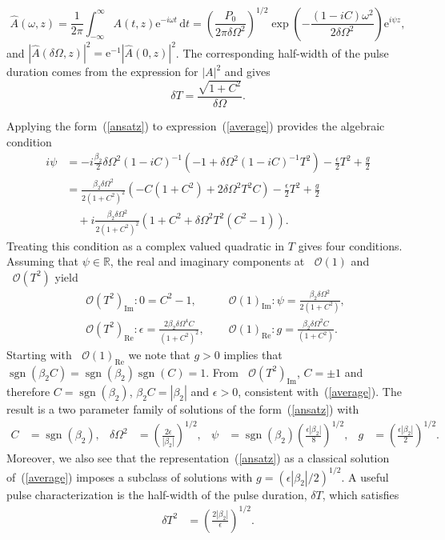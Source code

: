\documentclass[12pt]{article}
\providecommand{\df}{\textrm{d}}
\providecommand{\bigO}[1]{\ensuremath{\mathop{}\mathopen{}\mathcal{O}\mathopen{}\left(#1\right)}}
\DeclareMathOperator{\sgn}{sgn}
\begin{document}
\[
	\hat{A}(\omega,z) = \frac{1}{2\pi}\int_{-\infty}^\infty A(t,z) \textrm{e}^{-i\omega t}\, \df t
	= \left(\frac{P_0}{2\pi\delta \Omega^2}\right)^{1/2}
	\exp\left(-\frac{(1-i C)\omega^2}{2\delta \Omega^2}\right) \textrm{e}^{i\psi z},
\]
and $|\hat{A}(\delta\Omega,z)|^2 = \textrm{e}^{-1}|\hat{A}(0,z)|^2$. The corresponding half-width of the pulse duration comes from the expression for $|A|^2$ and gives
\begin{equation}
\label{duration}
	\delta T = \frac{\sqrt{1+C^2}}{\delta \Omega}.
\end{equation}

Applying the form~(\ref{ansatz}) to expression~(\ref{average}) provides the algebraic condition
\begin{align*}
	i\psi &= -i\frac{\beta_2}{2}\delta\Omega^2(1-iC)^{-1}
	\left(-1 + \delta\Omega^2(1-iC)^{-1}T^2\right)-\frac{\epsilon}{2}T^2 + \frac{g}{2} \\
	&= \frac{\beta_2\delta\Omega^2}{2(1+C^2)^2}(-C(1+C^2)+2\delta\Omega^2 T^2C) -\frac{\epsilon}{2}T^2 + \frac{g}{2}\\
	& \quad + i\frac{\beta_2\delta\Omega^2}{2(1+C^2)^2}(1+C^2 + \delta\Omega^2 T^2(C^2-1)).
\end{align*}
Treating this condition as a complex valued quadratic in $T$ gives four conditions. Assuming that $\psi\in\mathbb{R}$, the real and imaginary components at $\bigO{1}$ and $\bigO{T^2}$ yield
\begin{align*}
	&\bigO{T^2}_{\textrm{Im}}: 0 = C^2 - 1, &
	&\bigO{1}_{\textrm{Im}}: \psi = \frac{\beta_2\delta\Omega^2}{2(1+C^2)}, \\
	&\bigO{T^2}_{\textrm{Re}}: \epsilon = \frac{2\beta_2\delta\Omega^4C}{(1+C^2)^2}, &
	&\bigO{1}_{\textrm{Re}}: g = \frac{\beta_2\delta\Omega^2C}{(1+C^2)}.
\end{align*}
Starting with $\bigO{1}_{\textrm{Re}}$ we note that $g > 0$ implies that $\sgn(\beta_2 C) = \sgn(\beta_2)\sgn(C) = 1$. From $\bigO{T^2}_{\textrm{Im}}$, $C = \pm 1$ and therefore $C = \sgn(\beta_2)$, $\beta_2 C = |\beta_2|$ and $\epsilon > 0$, consistent with~(\ref{average}). The result is a two parameter family of solutions of the form~(\ref{ansatz}) with
\begin{align*}
	C &= \sgn(\beta_2),&
	\delta\Omega^2 &= \left(\frac{2\epsilon}{|\beta_2|}\right)^{1/2},&
	\psi &= \sgn(\beta_2)\left(\frac{\epsilon|\beta_2|}{8}\right)^{1/2},&
	g &= \left(\frac{\epsilon|\beta_2|}{2}\right)^{1/2}.
\end{align*}
Moreover, we also see that the representation~(\ref{ansatz}) as a classical solution of~(\ref{average}) imposes a subclass of solutions with $g = \left(\epsilon|\beta_2|/2\right)^{1/2}$. A useful pulse characterization is the half-width of the pulse duration, $\delta T$, which satisfies
\begin{align*}
	\delta T^2 &= \left(\frac{2|\beta_2|}{\epsilon}\right)^{1/2}.
\end{align*}
\end{document}
